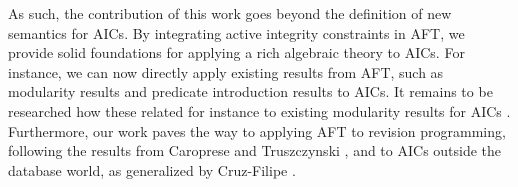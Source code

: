 \documentclass[runningheads]{llncs}
\begin{document}

As such, the contribution of this work goes beyond the definition of new semantics for AICs. 
By integrating active integrity constraints in AFT, we provide solid foundations for applying a rich algebraic theory to AICs.
For instance, we can now directly apply existing results from AFT, such as modularity results and predicate introduction results to AICs. 
It remains to be researched how these related for instance to existing modularity results for AICs \cite{foiks/Cruz-Filipe14,iclp/Cruz-Filipe16}. 
Furthermore, our work paves the way to applying AFT to revision programming, following the results from Caroprese and Truszczynski \cite{tplp/CaropreseT11}, and to AICs outside the database world, as generalized by Cruz-Filipe \cite{ekaw/Cruz-Filipe16}.
\end{document}

